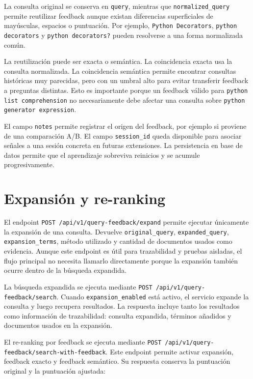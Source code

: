 \documentclass[12pt,a4paper]{article}
\begin{document}
La consulta original se conserva en \texttt{query}, mientras que \texttt{normalized\_query} permite reutilizar feedback aunque existan diferencias superficiales de mayúsculas, espacios o puntuación. Por ejemplo, \texttt{Python Decorators}, \texttt{python decorators} y \texttt{python decorators?} pueden resolverse a una forma normalizada común.

La reutilización puede ser exacta o semántica. La coincidencia exacta usa la consulta normalizada. La coincidencia semántica permite encontrar consultas históricas muy parecidas, pero con un umbral alto para evitar transferir feedback a preguntas distintas. Esto es importante porque un feedback válido para \texttt{python list comprehension} no necesariamente debe afectar una consulta sobre \texttt{python generator expression}.

El campo \texttt{notes} permite registrar el origen del feedback, por ejemplo si proviene de una comparación A/B. El campo \texttt{session\_id} queda disponible para asociar señales a una sesión concreta en futuras extensiones. La persistencia en base de datos permite que el aprendizaje sobreviva reinicios y se acumule progresivamente.

\section{Expansión y re-ranking}

El endpoint \texttt{POST /api/v1/query-feedback/expand} permite ejecutar únicamente la expansión de una consulta. Devuelve \texttt{original\_query}, \texttt{expanded\_query}, \texttt{expansion\_terms}, método utilizado y cantidad de documentos usados como evidencia. Aunque este endpoint es útil para trazabilidad y pruebas aisladas, el flujo principal no necesita llamarlo directamente porque la expansión también ocurre dentro de la búsqueda expandida.

La búsqueda expandida se ejecuta mediante \texttt{POST /api/v1/query-feedback/search}. Cuando \texttt{expansion\_enabled} está activo, el servicio expande la consulta y luego recupera resultados. La respuesta incluye tanto los resultados como información de trazabilidad: consulta expandida, términos añadidos y documentos usados en la expansión.

El re-ranking por feedback se ejecuta mediante \texttt{POST /api/v1/query-feedback/search-with-feedback}. Este endpoint permite activar expansión, feedback exacto y feedback semántico. Su respuesta conserva la puntuación original y la puntuación ajustada:
\end{document}
